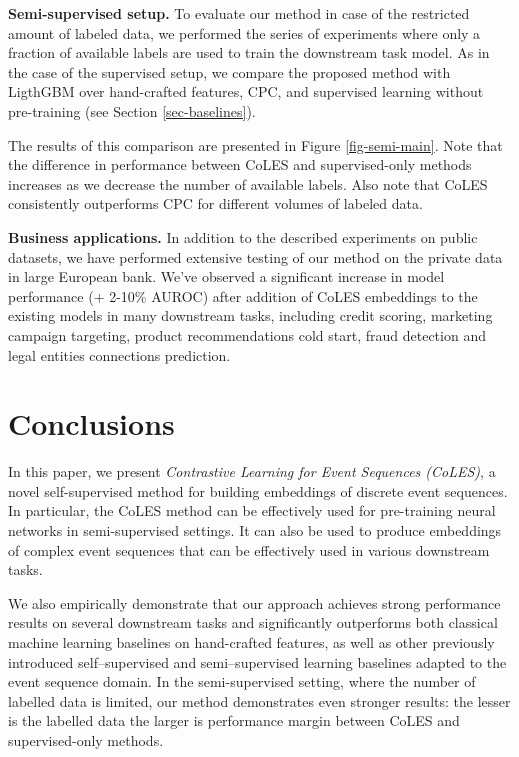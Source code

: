 \documentclass{article}
\begin{document}
\textbf{Semi-supervised setup.} To evaluate our method in case of the restricted amount of labeled data, we performed the series of experiments where only a fraction of available labels are used to train the downstream task model.
As in the case of the supervised setup, we compare the proposed method with LigthGBM over hand-crafted features, CPC, and supervised learning without pre-training (see Section \ref{sec-baselines}).

The results of this comparison are presented in Figure \ref{fig-semi-main}.
Note that the difference in performance between CoLES and supervised-only methods increases as we decrease the number of available labels. Also note that CoLES consistently outperforms CPC for different volumes of labeled data.

\textbf{Business applications.} In addition to the described experiments on public datasets, we have performed extensive testing of our method on the private data in large European bank. We've observed a significant increase in model performance (+ 2-10\% AUROC) after addition of CoLES embeddings to the existing models in many downstream tasks, including credit scoring, marketing campaign targeting, product recommendations cold start, fraud detection and legal entities connections prediction.


\section{Conclusions} \label{sec-conclusions}

In this paper, we present \emph{Contrastive Learning for Event Sequences (CoLES)}, a novel self-supervised method for building embeddings of discrete event sequences.
In particular, the CoLES method can be effectively used for pre-training neural networks in semi-supervised settings. It can also be used to produce embeddings of complex event sequences that can be effectively used in various downstream tasks.

We also empirically demonstrate that our approach achieves strong performance results on several downstream tasks and significantly outperforms both classical machine learning baselines on hand-crafted features, as well as other  previously introduced  self--supervised and semi--supervised learning baselines adapted to the event sequence domain.
In the semi-supervised setting, where the number of labelled data is limited, our method demonstrates even stronger results: the lesser is the labelled data the larger is performance margin between CoLES and supervised-only methods.
\end{document}
